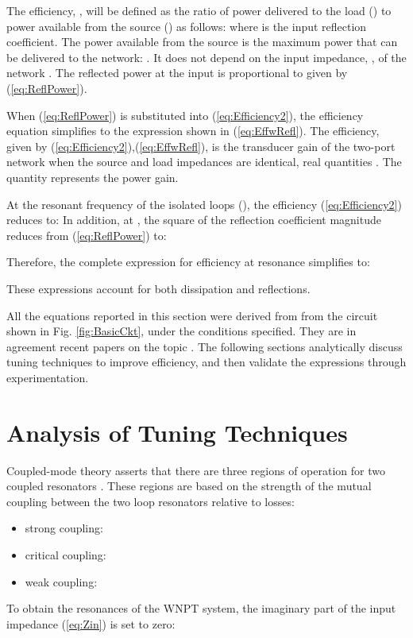 \documentclass[journal]{IEEEtran}
\begin{document}
The efficiency, , will be defined as the ratio of power delivered to the load () to power available from the source () as follows:
 where  is the input reflection coefficient. The power available from the source is the maximum power that can be delivered to the network: . It does not depend on the input impedance, , of the network \cite{Gonz}. The reflected power at the input is proportional to  given by (\ref{eq:ReflPower}).

\setcounter{equation}{7}

When (\ref{eq:ReflPower}) is substituted into (\ref{eq:Efficiency2}), the efficiency equation simplifies to the expression shown in (\ref{eq:EffwRefl}). The efficiency, given by (\ref{eq:Efficiency2}),(\ref{eq:EffwRefl}), is the transducer gain of the two-port network when the source and load impedances are identical, real quantities \cite{Pozar}. The quantity  represents the power gain.

At the resonant frequency of the isolated  loops (), the efficiency (\ref{eq:Efficiency2}) reduces to:
  In addition, at , the square of the reflection coefficient magnitude reduces from (\ref{eq:ReflPower}) to:

Therefore, the complete expression for efficiency at resonance  simplifies to:

These expressions account for both dissipation and reflections.

All the equations reported in this section were derived from from the circuit shown in Fig. \ref{fig:BasicCkt}, under the conditions specified. They are in agreement recent papers on the topic \cite{Coil4ConsumerElec, WPTnear2far, Midfield4Implantable, MidrangeWNPTeqs}. The following sections analytically discuss tuning techniques to improve efficiency, and then validate the expressions through experimentation.

\section{Analysis of Tuning Techniques}

Coupled-mode theory asserts that there are three regions of operation for two coupled resonators \cite{Soljacic, Everitt}. These regions are based on the strength of the mutual coupling between the two loop resonators relative to losses:
\begin{itemize}
\item strong coupling: 
\item critical coupling: 
\item weak coupling: 
\end{itemize}
To obtain the resonances of the WNPT system, the imaginary part of the input impedance (\ref{eq:Zin}) is set to zero:
\end{document}
